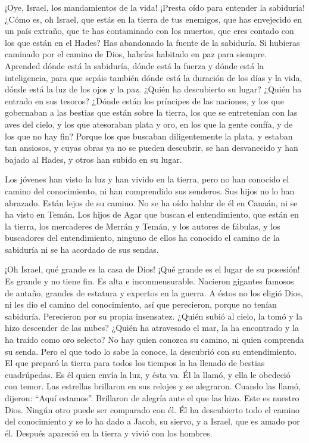  ¡Oye, Israel, los mandamientos de la vida! ¡Presta oído
para entender la sabiduría!  ¿Cómo es, oh Israel, que
estás en la tierra de tus enemigos, que has envejecido en un país
extraño, que te has contaminado con los muertos,  que
eres contado con los que están en el Hades?  Has
abandonado la fuente de la sabiduría.  Si hubieras
caminado por el camino de Dios, habrías habitado en paz para siempre.
 Aprended dónde está la sabiduría, dónde está la fuerza y
dónde está la inteligencia, para que sepáis también dónde está la
duración de los días y la vida, dónde está la luz de los ojos y la paz.
 ¿Quién ha descubierto su lugar? ¿Quién ha entrado en sus
tesoros?  ¿Dónde están los príncipes de las naciones, y
los que gobernaban a las bestias que están sobre la tierra,
 los que se entretenían con las aves del cielo, y los que
atesoraban plata y oro, en los que la gente confía, y de los que no hay
fin?  Porque los que buscaban diligentemente la plata, y
estaban tan ansiosos, y cuyas obras ya no se pueden descubrir,
 se han desvanecido y han bajado al Hades, y otros han
subido en su lugar.

 Los jóvenes han visto la luz y han vivido en la tierra,
pero no han conocido el camino del conocimiento,  ni han
comprendido sus senderos. Sus hijos no lo han abrazado. Están lejos de
su camino.  No se ha oído hablar de él en Canaán, ni se
ha visto en Temán.  Los hijos de Agar que buscan el
entendimiento, que están en la tierra, los mercaderes de Merrán y Temán,
y los autores de fábulas, y los buscadores del entendimiento, ninguno de
ellos ha conocido el camino de la sabiduría ni se ha acordado de sus
sendas.

 ¡Oh Israel, qué grande es la casa de Dios! ¡Qué grande
es el lugar de su posesión!  Es grande y no tiene fin. Es
alta e inconmensurable.  Nacieron gigantes famosos de
antaño, grandes de estatura y expertos en la guerra.  A
éstos no los eligió Dios, ni les dio el camino del conocimiento,
 así que perecieron, porque no tenían sabiduría.
Perecieron por su propia insensatez.  ¿Quién subió al
cielo, la tomó y la hizo descender de las nubes?  ¿Quién
ha atravesado el mar, la ha encontrado y la ha traído como oro selecto?
 No hay quien conozca su camino, ni quien comprenda su
senda.  Pero el que todo lo sabe la conoce, la descubrió
con su entendimiento. El que preparó la tierra para todos los tiempos la
ha llenado de bestias cuadrúpedas.  Es él quien envía la
luz, y ésta va. Él la llamó, y ella le obedeció con temor.
 Las estrellas brillaron en sus relojes y se alegraron.
Cuando las llamó, dijeron: ``Aquí estamos''. Brillaron de alegría ante
el que las hizo.  Este es nuestro Dios. Ningún otro puede
ser comparado con él.  Él ha descubierto todo el camino
del conocimiento y se lo ha dado a Jacob, su siervo, y a Israel, que es
amado por él.  Después apareció en la tierra y vivió con
los hombres.

